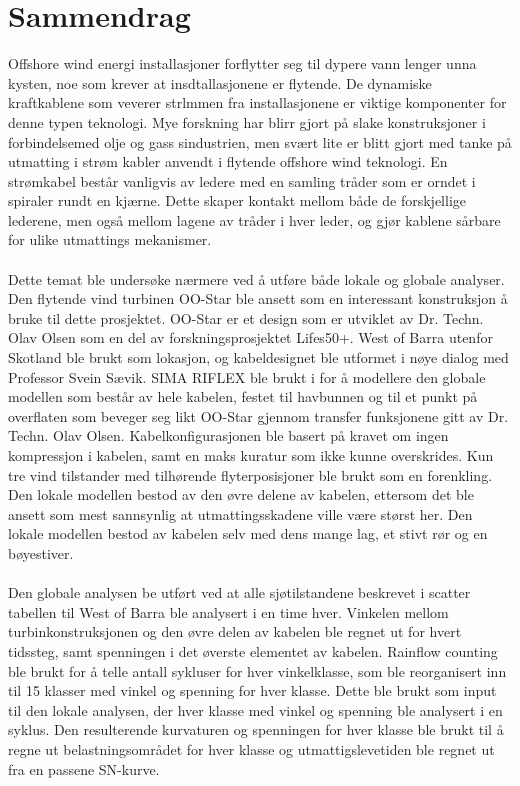 \chapter*{Sammendrag}
Offshore wind energi installasjoner forflytter seg til dypere vann lenger unna kysten, noe som krever at insdtallasjonene er flytende. De dynamiske kraftkablene som veverer strlmmen fra installasjonene er viktige komponenter for denne typen teknologi. Mye forskning har blirr gjort på slake konstruksjoner i forbindelsemed olje og gass sindustrien, men svært lite er blitt gjort med tanke på utmatting i strøm kabler anvendt i flytende offshore wind teknologi. En strømkabel består vanligvis av ledere med en samling tråder som er orndet i spiraler rundt en kjærne. Dette skaper kontakt mellom både de forskjellige lederene, men også mellom lagene av tråder i hver leder, og gjør kablene sårbare for ulike utmattings mekanismer. \\\\
Dette temat ble undersøke nærmere ved å utføre både lokale og globale analyser. Den flytende vind turbinen OO-Star ble ansett som en interessant konstruksjon å bruke til dette prosjektet. OO-Star er et design som er utviklet av Dr. Techn. Olav Olsen som en del av forskningsprosjektet Lifes50+. West of Barra utenfor Skotland ble brukt som lokasjon, og kabeldesignet ble utformet i nøye dialog med Professor Svein Sævik. SIMA RIFLEX ble brukt i for å modellere den globale modellen som består av hele kabelen, festet til havbunnen og til et punkt på overflaten som beveger seg likt OO-Star gjennom transfer funksjonene gitt av Dr. Techn. Olav Olsen. Kabelkonfigurasjonen ble basert på kravet om ingen kompressjon i kabelen, samt en maks kuratur som ikke kunne overskrides. Kun tre vind tilstander med tilhørende flyterposisjoner ble brukt som en forenkling. Den lokale modellen bestod av den øvre delene av kabelen, ettersom det ble ansett som mest sannsynlig at utmattingsskadene ville være størst her. Den lokale modellen bestod av kabelen selv med dens mange lag, et stivt rør og en bøyestiver.\\\\
Den globale analysen be utført ved at alle sjøtilstandene beskrevet i scatter tabellen til West of Barra ble analysert i en time hver. Vinkelen mellom turbinkonstruksjonen og den øvre delen av kabelen ble regnet ut for hvert tidssteg, samt spenningen i det øverste elementet av kabelen. Rainflow counting ble brukt for å telle antall sykluser for hver vinkelklasse, som ble reorganisert inn til 15 klasser med vinkel og spenning for hver klasse. Dette ble brukt som input til den lokale analysen, der hver klasse  med vinkel og spenning ble analysert i en syklus. Den resulterende kurvaturen og spenningen for hver klasse ble brukt til å regne ut belastningsområdet for hver klasse og utmattigslevetiden ble regnet ut fra en passene SN-kurve. \\\\
